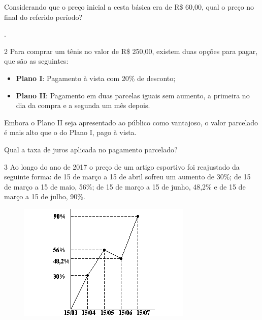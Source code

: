 \begin{escolha}
Considerando que o preço inicial a cesta básica era de R\$ 60,00, qual
o preço no final do referido período?

\begin{boxpeq}
.
\end{boxpeq}

\num{2} Para comprar um tênis no valor de R\$ 250,00, existem duas opções
para pagar, que são as seguintes:

\begin{itemize}
  \item \textbf{Plano I}: Pagamento à vista com 20\% de desconto;

  \item \textbf{Plano II}: Pagamento em duas parcelas iguais sem aumento, a primeira no dia da compra e a segunda um mês depois.
\end{itemize}

Embora o Plano II seja apresentado ao público como vantajoso, o valor
parcelado é mais alto que o do Plano I, pago à vista.

Qual a taxa de juros aplicada no pagamento parcelado?

\begin{largebox}
\end{largebox}

\num{3} Ao longo do ano de 2017 o preço de um artigo esportivo foi
reajustado da seguinte forma: de 15 de março a 15 de abril sofreu um
aumento de 30\%; de 15 de março a 15 de maio, 56\%; de 15 de março a 15
de junho, 48,2\% e de 15 de março a 15 de julho, 90\%.

\begin{figure}
\centering
\includegraphics[width=3.25in,height=2.18333in]{./_SAEB_9_MAT/media/image58.png}
\end{figure}


\end{escolha}
